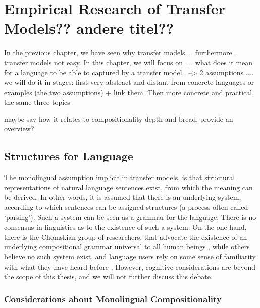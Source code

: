 \documentclass{report}
\theoremstyle{break}
\begin{document}
 
 
\chapter{Empirical Research of Transfer Models?? andere titel??}
\label{ch:empirical} 

In the previous chapter, we have seen why transfer models.... furthermore... transfer models not easy. In this chapter, we will focus on .... what does it mean for a language to be able to captured by a transfer model.. --> 2 assumptions .... we will do it in stages: first very abstract and distant from concrete languages or examples (the two assumptions) + link them. Then more concrete and practical, the same three topics

maybe say how it relates to compositionality
depth and bread, provide an overview?


\section{Structures for Language}

The monolingual assumption implicit in transfer models, is that structural representations of natural language sentences exist, from which the meaning can be derived. In other words, it is assumed that there is an underlying system, according to which sentences can be assigned structures (a process often called `parsing'). Such a system can be seen as a grammar for the language. There is no consensus in linguistics as to the existence of such a system. On the one hand, there is the Chomskian group of researchers, that advocate the existence of an underlying compositional grammar universal to all human beings \citep[As first claimed in][]{chomsky1956three}, while others believe no such system exist, and language users rely on some sense of familiarity with what they have heard before \citep[e.g.,][]{scha1990taaltheorie, frank2012hierarchical}. However, cognitive considerations are beyond the scope of this thesis, and we will not further discuss this debate. 


\subsection{Considerations about Monolingual Compositionality}
\end{document}

